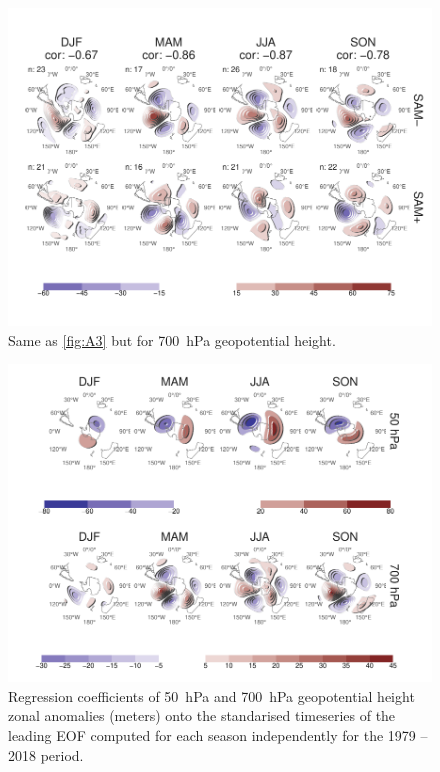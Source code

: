 \documentclass[smallextended]{svjour3}       %
\begin{document}
\begin{figure}
\includegraphics{A4-1} \caption{Same as \ref{fig:A3} but for 700~hPa geopotential height.}\label{fig:A4}
\end{figure}

\begin{figure}
\includegraphics{A5-1} \caption{Regression coefficients of 50~hPa and 700~hPa geopotential height zonal anomalies (meters) onto the standarised timeseries of the leading EOF computed for each season independently for the 1979 -- 2018 period.}\label{fig:A5}
\end{figure}
\end{document}
